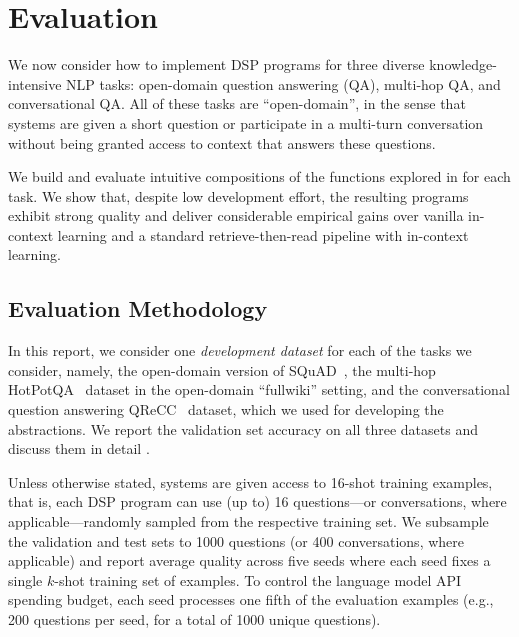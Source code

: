 \section{Evaluation}
\label{sec:eval}

We now consider how to implement DSP programs for three diverse knowledge-intensive NLP tasks: open-domain question answering (QA), multi-hop QA, and conversational QA. All of these tasks are ``open-domain'', in the sense that systems are given a short question or participate in a multi-turn conversation without being granted access to context that answers these questions.

We build and evaluate intuitive compositions of the functions explored in  for each task. We show that, despite low development effort, the resulting \DSP programs exhibit strong quality and deliver considerable empirical gains over vanilla in-context learning and a standard retrieve-then-read pipeline with in-context learning.





\subsection{Evaluation Methodology}

In this report, we consider one \textit{development dataset} for each of the tasks we consider, namely, the open-domain version of SQuAD~\cite{rajpurkar2016squad,lee2019latent}, the multi-hop HotPotQA~\cite{yang2018hotpotqa} dataset in the open-domain ``fullwiki'' setting, and the conversational question answering QReCC~\cite{anantha2020open,vakulenko-etal-2022-scai} dataset, which we used for developing the \DSP abstractions. We report the validation set accuracy on all three datasets and discuss them in detail .

Unless otherwise stated, systems are given access to 16-shot training examples, that is, each DSP program can use (up to) 16 questions---or conversations, where applicable---randomly sampled from the respective training set. We subsample the validation and test sets to 1000 questions (or 400 conversations, where applicable) and report average quality across five seeds where each seed fixes a single $k$-shot training set of examples. To control the language model API spending budget, each seed processes one fifth of the evaluation examples (e.g., 200 questions per seed, for a total of 1000 unique questions).

